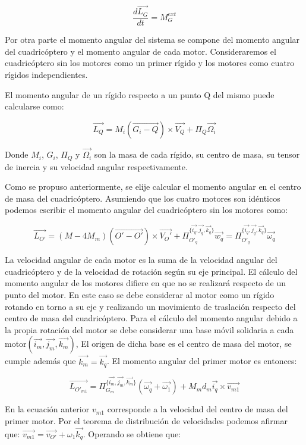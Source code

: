 \documentclass[main]{subfiles}
\begin{document}
$$\frac{d\vec{L_G}}{dt} =M_G^{ext}$$



Por otra parte el momento angular del sistema se compone del momento angular del cuadric\'optero y el momento angular de cada motor. Consideraremos el cuadric\'optero sin los motores como un primer r\'igido y los motores como cuatro r\'igidos independientes.

El momento angular de un r\'igido respecto a un punto Q del mismo puede calcularse como:

$$\vec{L_Q} = M_i(\vec{G_i-Q})\times\vec{V_Q}+\Pi_{Q}\vec{\Omega_i}$$

Donde $M_i$, $G_i$, $\Pi_{Q}$ y $\vec{\Omega_i}$ son la masa de cada r\'igido, su centro de masa, su tensor de inercia y su velocidad angular respectivamente.

Como se propuso anteriormente, se elije calcular el momento angular en el centro de masa del cuadric\'optero. Asumiendo que los cuatro motores son id\'enticos podemos escribir el momento angular del cuadric\'optero sin los motores como:

$$\vec{L_{O\prime}} = (M-4 M_m)(\vec{O\prime-O\prime})\times\vec{V_O\prime}+\Pi_{O\prime_q}^{\{\vec{i_q}, \vec{j_q}, \vec{k_q}\}}\vec{w_q}=\Pi_{O\prime_q}^{\{\vec{i_q}, \vec{j_q}, \vec{k_q}\}}\vec{\omega_q}$$

La velocidad angular de cada motor es la suma de la velocidad angular del cuadric\'optero y de la velocidad de rotaci\'on seg\'un su eje principal. El c\'alculo del momento angular de los motores difiere en que no se realizar\'a respecto de un punto del motor. En este caso se debe considerar al motor como un r\'igido rotando en torno a su eje y realizando un movimiento de traslaci\'on respecto del centro de masa del cuadric\'optero. Para el c\'alculo del momento angular debido a la propia rotaci\'on del motor se debe considerar una base m\'ovil solidaria a cada motor$(\vec{i_m}, \vec{j_m}, \vec{k_m})$, El origen de dicha base es el centro de masa del motor, se cumple adem\'as que $\vec{k_m}=\vec{k_q}$. El momento angular del primer motor es entonces:

$$\vec{L_{O\prime_{m1}}} = \Pi_{G_m}^{\{\vec{i_m}, \vec{j_m}, \vec{k_m}\}}(\vec{\omega_q}+\vec{\omega_1})+M_md_m\vec{i_q}\times \vec{v_{m1}} $$


En la ecuaci\'on anterior $v_{m1}$ corresponde a la velocidad del centro de masa del primer motor. Por el teorema de distribuci\'on de velocidades podemos afirmar que: $\vec{v_{m1}}=\vec{v_{O\prime}}+\omega_1\vec{k_q}$. Operando se obtiene que:
\end{document}
